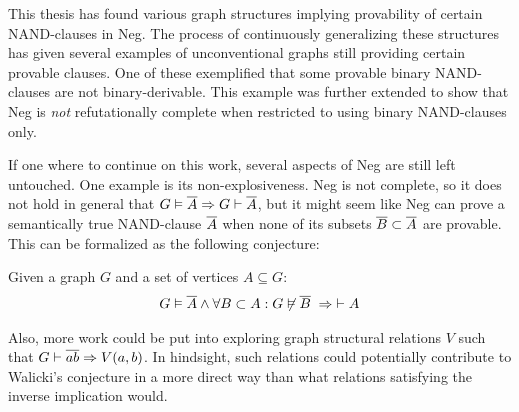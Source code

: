 This thesis has found various graph structures implying provability of certain NAND-clauses in Neg.
The process of continuously generalizing these structures has given several examples of unconventional graphs still providing certain provable clauses.
One of these exemplified that some provable binary NAND-clauses are not binary-derivable.
This example was further extended to show that Neg is \textit{not} refutationally complete when restricted to using binary NAND-clauses only.

If one where to continue on this work, several aspects of Neg are still left untouched.
One example is its non-explosiveness.
Neg is not complete, so it does not hold in general that $G \vDash \ol{A} \Rightarrow G \vdash \ol{A}$, but it might seem like Neg can prove a semantically true NAND-clause $\ol{A}$ when none of its subsets $\ol{B} \subset \ol{A}$ are provable.
This can be formalized as the following conjecture:
\begin{conjecture}
  Given a graph $G$ and a set of vertices $A \subseteq G$:
  \begin{align}
    G \vDash \ol{A} \wedge \forall B \subset A: G \not\vDash \ol{ B } \;\Rightarrow \; \vdash A
  \end{align}
\end{conjecture}

Also, more work could be put into exploring graph structural relations $V$ such that $G \vdash \ol{ab} \Rightarrow V(a,b)$.
In hindsight, such relations could potentially contribute to Walicki's conjecture in a more direct way than what relations satisfying the inverse implication would.
